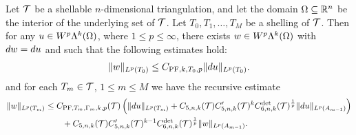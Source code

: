 \documentclass[10pt,a4paper]{article}
\begin{document}
\begin{theorem}\label{theorem:poincarefriedrichsestimate:exterior}
	Let ${\mathcal T}$ be a shellable $n$-dimensional triangulation, and let the domain $\Omega \subseteq {\mathbb R}^{n}$ be the interior of the underlying set of ${\mathcal T}$.
    Let $T_0, T_1, \dots, T_M$ be a shelling of ${\mathcal T}$.
    Then for any $u \in W^{p}\Lambda^{k}(\Omega)$, where $1 \leq p \leq \infty$, 
    there exists $w \in W^{p}\Lambda^{k}(\Omega)$ with $d w = d u$
	and such that the following estimates hold:
	\begin{gather*}
        \| w \|_{L^{p}(T_{0})} \leq C_{{{\rm PF}},k,T_{0},p} \| d u \|_{L^{p}(T_{0})}.
    \end{gather*}
    and for each $T_{m} \in {\mathcal T}$, $1 \leq m \leq M$ we have the recursive estimate 
    \begin{align*}
        \| w \|_{L^{p}(T_{m})}
        &
        \leq  
        C_{{\rm PF},T_{m},\Gamma_{m},k,p}({\mathcal T}) 
        \left( 
            \| d u      \|_{L^{p}(T_{m})} 
            +
            C_{5,n,k}({\mathcal T})
            C'_{5,n,k}({\mathcal T})^{k} 
            C^{\det}_{6,n,k}({\mathcal T})^{\frac 1 p} 
            \| d u \|_{L^{p}(A_{m-1})}
        \right)
        \\&\qquad
        + 
        C_{5,n,k}({\mathcal T}) 
        C'_{5,n,k}({\mathcal T})^{k-1} 
        C^{\det}_{6,n,k}({\mathcal T})^{\frac 1 p} 
        \| w \|_{L^{p}(A_{m-1})}
        .
    \end{align*}
\end{theorem}
\end{document}
